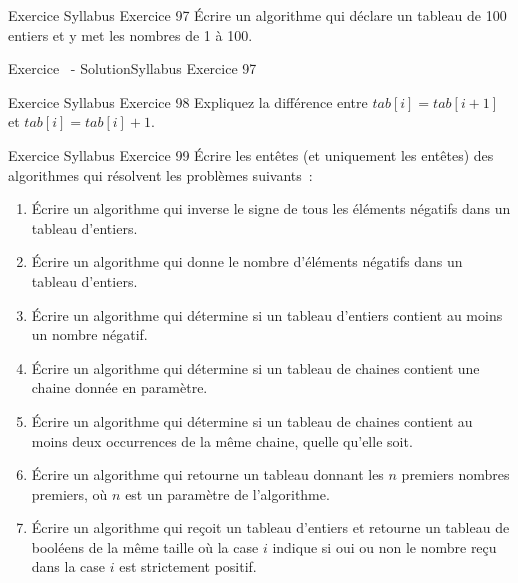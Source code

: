 \begin{frame}{Exercice \theexercice}{Syllabus Exercice 97}
    Écrire un algorithme qui déclare un tableau de 100 entiers
    et y met les nombres de 1 à 100.
\end{frame}

\begin{frame}{Exercice \theexercice~- Solution}{Syllabus Exercice 97}
    
\end{frame}

\begin{frame}{Exercice \theexercice}{Syllabus Exercice 98}
    Expliquez la différence entre $tab[i] = tab[i+1]$
    et $tab[i] = tab[i]+1$.
\end{frame}

\begin{frame}{Exercice \theexercice}{Syllabus Exercice 99}
    Écrire les entêtes (et uniquement les entêtes)
    des algorithmes qui résolvent les problèmes suivants~:
    \begin{enumerate}
        \item
        Écrire un algorithme qui
        inverse le signe de tous les éléments négatifs dans un tableau d’entiers.
        \item
        Écrire un algorithme qui
        donne le nombre d’éléments négatifs dans un tableau d’entiers.
        \item
        Écrire un algorithme qui
        détermine si un tableau d’entiers contient au moins un nombre négatif.
        \item
        Écrire un algorithme qui
        détermine si un tableau de chaines contient
        une chaine donnée en paramètre.
        \item
        Écrire un algorithme qui
        détermine si un tableau de chaines contient
        au moins deux occurrences de la même chaine,
        quelle qu’elle soit.
        \item
        Écrire un algorithme qui
        retourne un tableau donnant les $n$ premiers nombres premiers,
        où $n$ est un paramètre de l’algorithme.
        \item
        Écrire un algorithme qui
        reçoit un tableau d’entiers
        et retourne un tableau de booléens de la même taille
        où la case $i$ indique si oui ou non
        le nombre reçu dans la case $i$ est strictement positif.
    \end{enumerate}
\end{frame}

